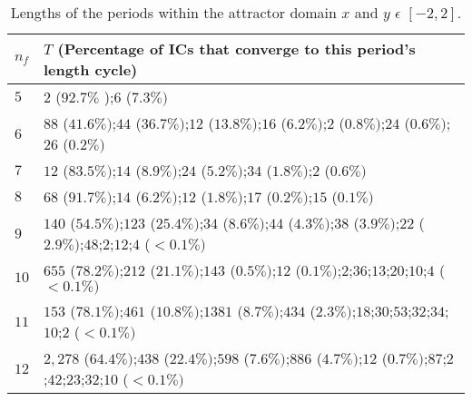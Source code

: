 \begin{table*}[!t]
	\renewcommand{\arraystretch}{1.3}
	\caption{Lengths of the periods within the attractor domain $x$ and $y$ $\epsilon$  $[-2,2]$.}
	\label{tabla}
	\centering
	\fontsize{9}{9}\selectfont
	\begin{tabular}{l  l  }
		\hline
		$n_f$   & $T$ {\scriptsize(Percentage of ICs that converge to this period's length cycle)}                                                                                                                                           \\ \hline\hline
		$5$     & $2$ {\scriptsize($92.7\%$ )};$6$  {\scriptsize($7.3\% )$}                                                                                                                                                                  \\
		$6$     & $88$ {\scriptsize($41.6 \% )$};$44$ {\scriptsize($36.7 \% )$};$12$ {\scriptsize($13.8\% )$};$16$ {\scriptsize($6.2 \% )$};$2$ {\scriptsize($0.8 \% )$};$24$ {\scriptsize($0.6 \% )$};$26$ {\scriptsize($0.2 \%)$}          \\
		$7$     & $12$ {\scriptsize($83.5 \% )$};$14$ {\scriptsize($8.9\% )$};$24$ {\scriptsize($5.2\% )$};$34$ {\scriptsize($1.8 \% )$};$2$ {\scriptsize($0.6\% )$}                                                                         \\
		$8$     & $68$ {\scriptsize($91.7\%)$};$14$ {\scriptsize($6.2\%)$};$12$ {\scriptsize($1.8 \%)$};$17$ {\scriptsize($0.2\% )$};$15$ {\scriptsize($0.1 \%)$}                                                                            \\
		$9$     & $140$ {\scriptsize($54.5 \%)$};$123$ {\scriptsize($25.4 \%)$};$34$ {\scriptsize($8.6\%)$};$44$ {\scriptsize($4.3 \%)$};$38$ {\scriptsize($3.9 \%)$};$22$ {\scriptsize($2.9 \%)$};$48$;$2$;$12$;$4$ {\scriptsize($<0.1\%)$} \\
		$10$    & $655$ {\scriptsize($78.2\%)$};$212$ {\scriptsize($21.1\%)$};$143$ {\scriptsize($0.5\%)$};$12$ {\scriptsize($0.1\%)$};$2$;$36$;$13$;$20$;$10$;$4$ {\scriptsize($<0.1\%)$}                                                   \\
		$11$    & $153$ {\scriptsize($78.1\%)$};$461$ {\scriptsize($10.8\% )$};$1381$ {\scriptsize($8.7\%)$};$434$ {\scriptsize($2.3\%)$};$18$;$30$;$53$;$32$;$34$;$10$;$2$ {\scriptsize($<0.1\% )$}                                         \\
		$12$    & $2,278$ {\scriptsize($64.4\%)$};$438$ {\scriptsize($22.4\% )$};$598$ {\scriptsize($7.6\% )$};$886$ {\scriptsize($4.7 \%)$};$12$ {\scriptsize($0.7\%)$};$87$;$2$;$42$;$23$;$32$;$10$ {\scriptsize($<0.1\% )$}               \\

\end{tabular}
\end{table*}
